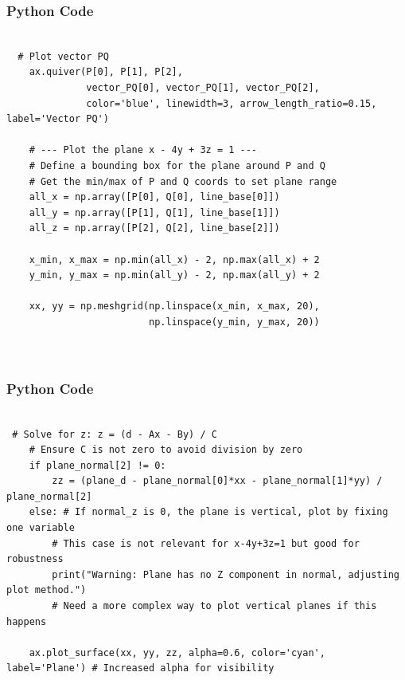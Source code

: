 \documentclass{beamer}
\begin{document}
\begin{frame}[fragile]
    \frametitle{Python Code}
    \begin{lstlisting}

  # Plot vector PQ
    ax.quiver(P[0], P[1], P[2],
              vector_PQ[0], vector_PQ[1], vector_PQ[2],
              color='blue', linewidth=3, arrow_length_ratio=0.15, label='Vector PQ')

    # --- Plot the plane x - 4y + 3z = 1 ---
    # Define a bounding box for the plane around P and Q
    # Get the min/max of P and Q coords to set plane range
    all_x = np.array([P[0], Q[0], line_base[0]])
    all_y = np.array([P[1], Q[1], line_base[1]])
    all_z = np.array([P[2], Q[2], line_base[2]])

    x_min, x_max = np.min(all_x) - 2, np.max(all_x) + 2
    y_min, y_max = np.min(all_y) - 2, np.max(all_y) + 2

    xx, yy = np.meshgrid(np.linspace(x_min, x_max, 20),
                         np.linspace(y_min, y_max, 20))
    
   

    \end{lstlisting}
\end{frame}

\begin{frame}[fragile]
    \frametitle{Python Code}
    \begin{lstlisting}

 # Solve for z: z = (d - Ax - By) / C
    # Ensure C is not zero to avoid division by zero
    if plane_normal[2] != 0:
        zz = (plane_d - plane_normal[0]*xx - plane_normal[1]*yy) / plane_normal[2]
    else: # If normal_z is 0, the plane is vertical, plot by fixing one variable
        # This case is not relevant for x-4y+3z=1 but good for robustness
        print("Warning: Plane has no Z component in normal, adjusting plot method.")
        # Need a more complex way to plot vertical planes if this happens

    ax.plot_surface(xx, yy, zz, alpha=0.6, color='cyan', label='Plane') # Increased alpha for visibility

   

    \end{lstlisting}
\end{frame}
\end{document}

